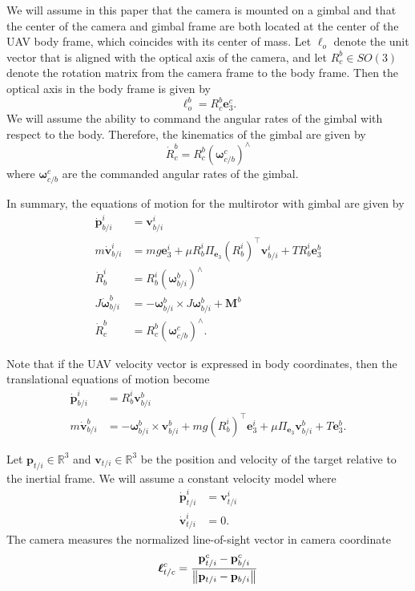 We will assume in this paper that the camera is mounted on a gimbal and that the center of the camera and gimbal frame are both located at the center of the UAV body frame, which coincides with its center of mass.  Let $\boldsymbol{\ell}_o$ denote the unit vector that is aligned with the optical axis of the camera, and let $R_c^b\in SO(3)$ denote the rotation matrix from the camera frame to the body frame.  Then the optical axis in the body frame is given by 
\[
\boldsymbol{\ell}_o^b = R_c^b \mathbf{e}_3^c.  
\]
We will assume the ability to command the angular rates of the gimbal with respect to the body.  Therefore, the kinematics of the gimbal are given by
\[
\dot{R}_c^b = R_c^b\left(\boldsymbol{\omega}_{c/b}^c\right)^\wedge
\]
where $\boldsymbol{\omega}_{c/b}^c$ are the commanded angular rates of the gimbal.

In summary, the equations of motion for the multirotor with gimbal are given by
\begin{align}
	\dot{\mathbf{p}}_{b/i}^i &= \mathbf{v}_{b/i}^i \label{eq:eom_p_b/i^i}\\
	m\dot{\mathbf{v}}_{b/i}^i &= mg\mathbf{e}_3^i + \mu R_b^i\Pi_{\mathbf{e}_3}(R_b^i)^\top \mathbf{v}_{b/i}^i + TR_b^i\mathbf{e}_3^b \label{eq:eom_v_b/i^i}\\
	\dot{R}_b^i &= R_b^i \left(\boldsymbol{\omega}_{b/i}^b\right)^\wedge \\
	J\dot{\boldsymbol{\omega}}_{b/i}^b &= -\boldsymbol{\omega}_{b/i}^b \times J\boldsymbol{\omega}_{b/i}^b + \mathbf{M}^b \\
	\dot{R}_c^b &= R_c^b\left(\boldsymbol{\omega}_{c/b}^c\right)^\wedge.
\end{align}

Note that if the UAV velocity vector is expressed in body coordinates, then the translational equations of motion become
\begin{align*}
	\dot{\mathbf{p}}_{b/i}^i &= R_b^i\mathbf{v}_{b/i}^b \\
	m\dot{\mathbf{v}}_{b/i}^b &= -\boldsymbol{\omega}_{b/i}^b\times\mathbf{v}_{b/i}^b + mg(R_b^i)^\top\mathbf{e}_3^i + \mu \Pi_{\mathbf{e}_3} \mathbf{v}_{b/i}^b + T\mathbf{e}_3^b.
\end{align*}

Let $\mathbf{p}_{t/i}\in\mathbb{R}^3$ and $\mathbf{v}_{t/i}\in\mathbb{R}^3$ be the position and velocity of the target relative to the inertial frame.  We will assume a constant velocity model where
\begin{align*}
	\dot{\mathbf{p}}_{t/i}^i &= \mathbf{v}_{t/i}^i \\
	\dot{\mathbf{v}}_{t/i}^i &= 0.	
\end{align*}
The camera measures the normalized line-of-sight vector in camera coordinate
\[
\boldsymbol{\ell}_{t/c}^c = \frac{\mathbf{p}_{t/i}^c-\mathbf{p}_{b/i}^c}{\left\|\mathbf{p}_{t/i}-\mathbf{p}_{b/i}\right\|}
\]

